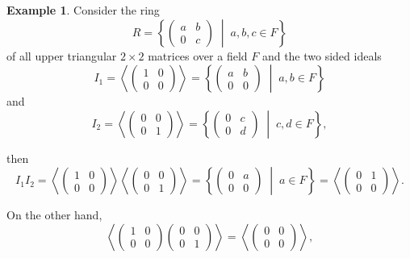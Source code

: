 \documentclass[12pt,a4paper]{amsart}
\theoremstyle{plain}
\theoremstyle{definition}
\newtheorem{example}[theorem]{Example}
\begin{document}
\begin{example}
	Consider the ring 
	\[
	R=\left\{ 
	\begin{pmatrix}
		a & b\\
		0 & c
	\end{pmatrix}
	\;\middle|\; a,b,c \in F
	\right\}
	\]
	of all upper triangular $2\times 2$ matrices over a field $F$ and the two sided ideals
	\[
	I_{1}
	= \left\langle 
	\begin{pmatrix}
		1 & 0\\
		0 & 0
	\end{pmatrix}
	\right\rangle
	= \left\{
	\begin{pmatrix}
		a & b\\
		0 & 0
	\end{pmatrix}
	\;\middle|\; a,b \in F
	\right\}
	\]
	and
	\[
	I_{2}
	= \left\langle 
	\begin{pmatrix}
		0 & 0\\
		0 & 1
	\end{pmatrix}
	\right\rangle
	= \left\{
	\begin{pmatrix}
		0 & c\\
		0 & d
	\end{pmatrix}
	\;\middle|\; c,d \in F
	\right\}, 
	\]
	
	then
	\[
	I_{1} I_{2}
	= \left\langle 
	\begin{pmatrix}
		1 & 0\\
		0 & 0
	\end{pmatrix}
	\right\rangle
	\left\langle 
	\begin{pmatrix}
		0 & 0\\
		0 & 1
	\end{pmatrix}
	\right\rangle
	= \left\{
	\begin{pmatrix}
		0 & a\\
		0 & 0
	\end{pmatrix}
	\;\middle|\; a \in F
	\right\}
	= \left\langle
	\begin{pmatrix}
		0 & 1\\
		0 & 0
	\end{pmatrix}
	\right\rangle.
	\]
	
	On the other hand,
	\[
	\left\langle
	\begin{pmatrix}
		1 & 0\\
		0 & 0
	\end{pmatrix}
	\begin{pmatrix}
		0 & 0\\
		0 & 1
	\end{pmatrix}
	\right\rangle
	=
	\left\langle
	\begin{pmatrix}
		0 & 0\\
		0 & 0
	\end{pmatrix}
	\right\rangle,
	\]
	

\end{example}
\end{document}
